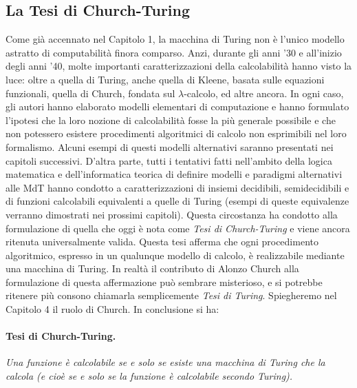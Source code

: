 \subsection{La Tesi di Church-Turing}

Come già accennato nel Capitolo 1, la macchina di Turing non è l'unico modello
astratto di computabilità finora comparso. Anzi, durante gli anni '30 e all'inizio
degli anni '40, molte importanti caratterizzazioni della calcolabilità hanno visto la
luce: oltre a quella di Turing, anche quella di Kleene, basata sulle equazioni
funzionali, quella di Church, fondata sul $\lambda$-calcolo, ed altre ancora. In ogni caso,
gli autori hanno elaborato modelli elementari di computazione e hanno formulato
l'ipotesi che la loro nozione di calcolabilità fosse la più generale possibile e che
non potessero esistere procedimenti algoritmici di calcolo non esprimibili nel loro
formalismo. Alcuni esempi di questi modelli alternativi saranno presentati nei
capitoli successivi. D'altra parte, tutti i tentativi fatti nell'ambito della logica
matematica e dell'informatica teorica di definire modelli e paradigmi alternativi
alle MdT hanno condotto a caratterizzazioni di insiemi decidibili, semidecidibili e
di funzioni calcolabili equivalenti a quelle di Turing (esempi di queste equivalenze
verranno dimostrati nei prossimi capitoli). Questa circostanza ha condotto alla
formulazione di quella che oggi è nota come \textit{Tesi di Church-Turing} e viene ancora
ritenuta universalmente valida. Questa tesi afferma che ogni procedimento
algoritmico, espresso in un qualunque modello di calcolo, è realizzabile mediante una
macchina di Turing. In realtà il contributo di Alonzo Church alla formulazione di
questa affermazione può sembrare misterioso, e si potrebbe ritenere più consono
chiamarla semplicemente \textit{Tesi di Turing}. Spiegheremo nel Capitolo 4 il ruolo di
Church. In conclusione si ha:

\paragraph{Tesi di Church-Turing.} \textit{Una funzione è calcolabile se e solo se
    esiste una macchina di Turing che la calcola (e cioè se e solo se la funzione è
    calcolabile secondo Turing).}\\

